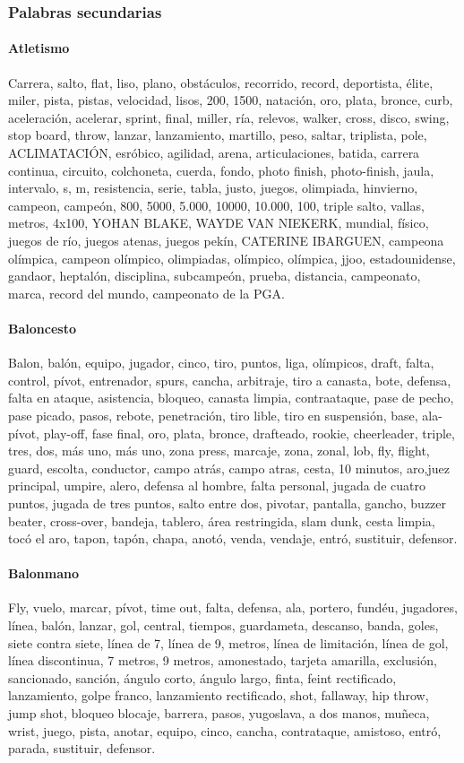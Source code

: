 \documentclass[../all.tex]{subfiles}
\begin{document}
\subsubsection{Palabras secundarias}
    \paragraph{Atletismo}
    Carrera, salto, flat, liso, plano, obstáculos, recorrido, record, deportista, élite, miler, pista, pistas, velocidad, lisos, 200, 1500, natación, oro, plata, bronce, curb, aceleración, acelerar, sprint, final, miller, ría, relevos, walker, cross, disco, swing, stop board, throw, lanzar, lanzamiento, martillo, peso, saltar, triplista, pole, ACLIMATACIÓN, esróbico, agilidad, arena, articulaciones, batida, carrera continua, circuito, colchoneta, cuerda, fondo, photo finish, photo-finish, jaula, intervalo, s, m, resistencia, serie, tabla, justo, juegos, olimpiada, hinvierno, campeon, campeón, 800, 5000, 5.000, 10000, 10.000, 100, triple salto, vallas, metros, 4x100, YOHAN BLAKE, WAYDE VAN NIEKERK, mundial, físico, juegos de río, juegos atenas, juegos pekín, CATERINE IBARGUEN, campeona olímpica, campeon olímpico, olimpiadas, olímpico, olímpica, jjoo, estadounidense, gandaor, heptalón, disciplina, subcampeón, prueba, distancia, campeonato, marca, record del mundo, campeonato de la PGA.
    \paragraph{Baloncesto}
    Balon, balón, equipo, jugador, cinco, tiro, puntos, liga, olímpicos, draft, falta, control, pívot, entrenador, spurs, cancha, arbitraje, tiro a canasta, bote, defensa, falta en ataque, asistencia, bloqueo, canasta limpia, contraataque, pase de pecho, pase picado, pasos, rebote, penetración, tiro lible, tiro en suspensión, base, ala-pívot, play-off, fase final, oro, plata, bronce, drafteado, rookie, cheerleader, triple, tres, dos, más uno, más uno, zona press, marcaje, zona, zonal, lob, fly, flight, guard, escolta, conductor, campo atrás, campo atras, cesta, 10 minutos, aro,juez principal, umpire, alero, defensa al hombre, falta personal, jugada de cuatro puntos, jugada de tres puntos, salto entre dos, pivotar, pantalla, gancho, buzzer beater, cross-over, bandeja, tablero, área restringida, slam dunk, cesta limpia, tocó el aro, tapon, tapón, chapa, anotó, venda, vendaje, entró, sustituir, defensor.
    \paragraph{Balonmano}
    Fly, vuelo, marcar, pívot, time out, falta, defensa, ala, portero, fundéu, jugadores, línea, balón, lanzar, gol, central, tiempos, guardameta, descanso, banda, goles, siete contra siete, línea de 7, línea de 9, metros, línea de limitación, línea de gol, línea discontinua, 7 metros, 9 metros, amonestado, tarjeta amarilla, exclusión, sancionado, sanción, ángulo corto, ángulo largo, finta, feint rectificado, lanzamiento, golpe franco, lanzamiento rectificado, shot, fallaway, hip throw, jump shot, bloqueo blocaje, barrera, pasos, yugoslava, a dos manos, muñeca, wrist, juego, pista, anotar, equipo, cinco, cancha, contrataque, amistoso, entró, parada, sustituir, defensor.
\end{document}
